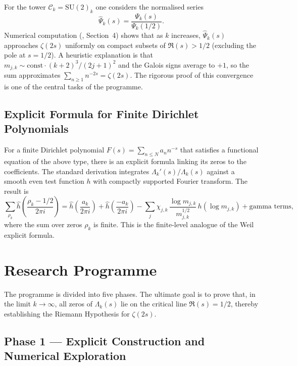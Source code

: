 \documentclass[11pt,a4paper]{article}
\theoremstyle{remark}
\begin{document}
For the tower \(\mathcal{C}_k=\mathrm{SU}(2)_k\) one considers the normalised series
\begin{equation}\label{eq:Psihat}
\widehat{\Psi}_k(s) = \frac{\Psi_k(s)}{\Psi_k(1/2)}.
\end{equation}
Numerical computation (\cite{qefe}, Section~4) shows that as \(k\) increases, \(\widehat{\Psi}_k(s)\) approaches \(\zeta(2s)\) uniformly on compact subsets of \(\Re(s)>1/2\) (excluding the pole at \(s=1/2\)).
A heuristic explanation is that \(m_{j,k}\sim \text{const}\cdot (k+2)^3/(2j+1)^2\) and the Galois signs average to \(+1\), so the sum approximates \(\sum_{n\ge1} n^{-2s} = \zeta(2s)\).
The rigorous proof of this convergence is one of the central tasks of the programme.

\subsection{Explicit Formula for Finite Dirichlet Polynomials}

For a finite Dirichlet polynomial \(F(s)=\sum_{n\le N} a_n n^{-s}\) that satisfies a functional equation of the above type, there is an explicit formula linking its zeros to the coefficients.
The standard derivation integrates \(\Lambda_k'(s)/\Lambda_k(s)\) against a smooth even test function \(h\) with compactly supported Fourier transform.
The result is
\begin{equation}\label{eq:explicit}
\sum_{\rho_k} \widehat{h}\!\left(\frac{\rho_k-1/2}{2\pi i}\right)
= \widehat{h}\!\left(\frac{a_k}{2\pi i}\right) + \widehat{h}\!\left(\frac{-a_k}{2\pi i}\right)
- \sum_{j} \chi_{j,k}\, \frac{\log m_{j,k}}{m_{j,k}^{1/2}}\, h(\log m_{j,k}) + \text{gamma terms},
\end{equation}
where the sum over zeros \(\rho_k\) is finite.
This is the finite‑level analogue of the Weil explicit formula.

\section{Research Programme}

The programme is divided into five phases.
The ultimate goal is to prove that, in the limit \(k\to\infty\), all zeros of \(\Lambda_k(s)\) lie on the critical line \(\Re(s)=1/2\), thereby establishing the Riemann Hypothesis for \(\zeta(2s)\).

\subsection{Phase 1 --- Explicit Construction and Numerical Exploration}
\end{document}
